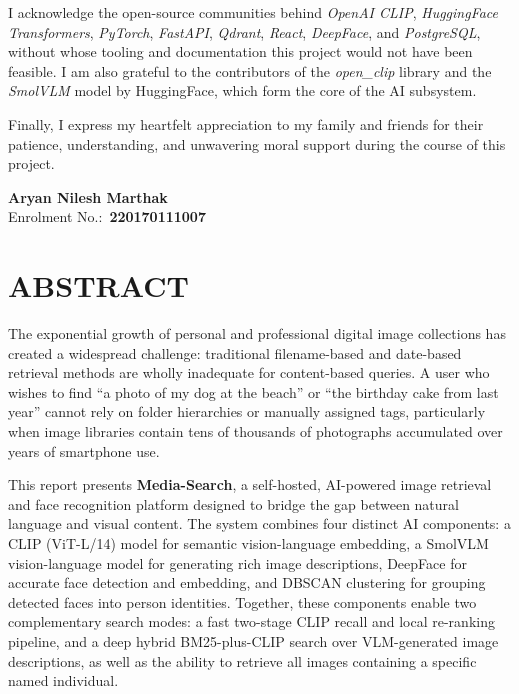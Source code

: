 \documentclass[12pt,a4paper,oneside]{report}
\begin{document}
I acknowledge the open-source communities behind \textit{OpenAI CLIP},
\textit{HuggingFace Transformers}, \textit{PyTorch}, \textit{FastAPI},
\textit{Qdrant}, \textit{React}, \textit{DeepFace}, and
\textit{PostgreSQL}, without whose tooling and documentation this project
would not have been feasible.  I am also grateful to the contributors of
the \textit{open\_clip} library and the \textit{SmolVLM} model by
HuggingFace, which form the core of the AI subsystem.

Finally, I express my heartfelt appreciation to my family and friends for
their patience, understanding, and unwavering moral support during the course
of this project.

\vspace{2cm}
\begin{flushright}
\textbf{Aryan Nilesh Marthak}\\
Enrolment No.:\ \textbf{220170111007}
\end{flushright}

\chapter*{ABSTRACT}
\thispagestyle{romanplain}

The exponential growth of personal and professional digital image collections
has created a widespread challenge: traditional filename-based and date-based
retrieval methods are wholly inadequate for content-based queries.  A user
who wishes to find ``a photo of my dog at the beach'' or ``the birthday cake
from last year'' cannot rely on folder hierarchies or manually assigned tags,
particularly when image libraries contain tens of thousands of photographs
accumulated over years of smartphone use.

This report presents \textbf{Media-Search}, a self-hosted, AI-powered image
retrieval and face recognition platform designed to bridge the gap between
natural language and visual content.  The system combines four distinct AI
components: a CLIP (ViT-L/14) model for semantic vision-language embedding,
a SmolVLM vision-language model for generating rich image descriptions,
DeepFace for accurate face detection and embedding, and DBSCAN clustering for
grouping detected faces into person identities.  Together, these components
enable two complementary search modes: a fast two-stage CLIP recall and local
re-ranking pipeline, and a deep hybrid BM25-plus-CLIP search over
VLM-generated image descriptions, as well as the ability to retrieve all
images containing a specific named individual.
\end{document}
